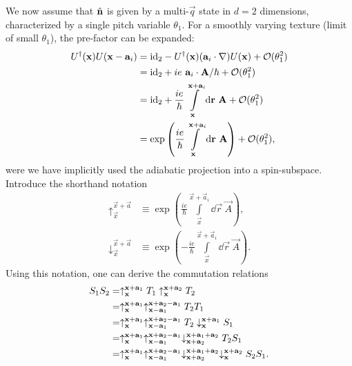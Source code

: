 \documentclass[
    10pt,
    aps,
    prb,
    twocolumn,
    floatfix,
    superscriptaddress,
]{revtex4-2}
\begin{document}
We now assume that $\hatn$ is given by a multi-$\vec{q}$ state in $d=2$ dimensions, characterized by a single pitch variable $\theta_1$.
For a smoothly varying texture (limit of small $\theta_1$), the pre-factor can be expanded:
\begin{align}
	U^\dagger ( \vec{x}) U( \vec{x} - \vec{a}_i) 
	& = \id_2
	- U^\dagger ( \vec{x})( \vec{a}_i \cdot \nabla) U( \vec{x} ) + \mathcal{O}(\theta_1^2)
	\notag \\
	& = \id_2
	+ i  e~\vec{a}_i  \cdot \vec{A} / \hbar + \mathcal{O}(\theta_1^2)
	\notag \\
	& = \id_2
	+ \frac{i e}{\hbar} \int\limits_{\vec{x}}^{\vec{x}+\vec{a}_i} \dd\vec{r}~\vec{A}  + \mathcal{O}(\theta_1^2) 
	\notag \\
	& = \exp\left( \frac{i e}{\hbar} \int\limits_{\vec{x}}^{\vec{x}+\vec{a}_i} \dd\vec{r}~\vec{A} \right) + \mathcal{O}(\theta_1^2) ,
\end{align}
were we have implicitly used the adiabatic projection into a spin-subspace.
Introduce the shorthand notation
\begin{align}
	\uparrow_{\vec{x}}^{\vec{x}+\vec{a} } &\equiv \exp\left( \frac{i e}{\hbar} \int\limits_{\vec{x}}^{\vec{x}+\vec{a}_i} \dd\vec{r}~\vec{A} \right) ,
	\\
	\downarrow_{\vec{x}}^{\vec{x}+\vec{a} } &\equiv \exp\left( -\frac{i e}{\hbar} \int\limits_{\vec{x}}^{\vec{x}+\vec{a}_i} \dd\vec{r}~\vec{A} \right) .
\end{align}
Using this notation, one can derive the commutation relations
\begin{align}
	S_1 S_2 &=
	\uparrow_{\vec{x}}^{\vec{x}+\vec{a}_1 } T_1 \uparrow_{\vec{x}}^{\vec{x}+\vec{a}_2 } T_2 
	\notag \\
	&=
	\uparrow_{\vec{x}}^{\vec{x}+\vec{a}_1 } \uparrow_{\vec{x}-\vec{a}_1}^{\vec{x}+\vec{a}_2 -\vec{a}_1} T_2  T_1
	\notag \\
	&=
	\uparrow_{\vec{x}}^{\vec{x}+\vec{a}_1 } \uparrow_{\vec{x}-\vec{a}_1}^{\vec{x}+\vec{a}_2 -\vec{a}_1} T_2 \downarrow_{\vec{x}}^{\vec{x}+\vec{a}_1 } S_1
	\notag \\
	&=
	\uparrow_{\vec{x}}^{\vec{x}+\vec{a}_1 } \uparrow_{\vec{x}-\vec{a}_1}^{\vec{x}+\vec{a}_2 -\vec{a}_1} \downarrow_{\vec{x}+\vec{a}_2}^{\vec{x}+\vec{a}_1+\vec{a}_2 }T_2  S_1
	\notag \\
	&=
	\uparrow_{\vec{x}}^{\vec{x}+\vec{a}_1 } \uparrow_{\vec{x}-\vec{a}_1}^{\vec{x}+\vec{a}_2 -\vec{a}_1} \downarrow_{\vec{x}+\vec{a}_2}^{\vec{x}+\vec{a}_1+\vec{a}_2 }
	\downarrow_{\vec{x}}^{\vec{x}+\vec{a}_2 }
	S_2  S_1 .
\end{align}
\end{document}
